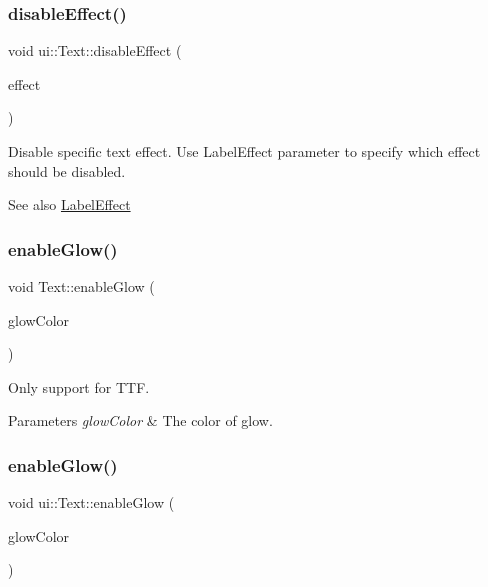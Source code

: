 \subsubsection{\texorpdfstring{disable\+Effect()}{disableEffect()}\hspace{0.1cm}{\footnotesize\ttfamily [4/4]}}
{\footnotesize\ttfamily void ui\+::\+Text\+::disable\+Effect (\begin{DoxyParamCaption}\item[{\hyperlink{group__base_ga26fd049ca5303e0cf4435208058f32e4}{Label\+Effect}}]{effect }\end{DoxyParamCaption})}

Disable specific text effect. Use Label\+Effect parameter to specify which effect should be disabled.

\begin{DoxySeeAlso}{See also}
{\ttfamily \hyperlink{group__base_ga26fd049ca5303e0cf4435208058f32e4}{Label\+Effect}} 
\end{DoxySeeAlso}
\mbox{\label{classui_1_1Text_ab97e762c34ec74d27b94077903554b8f}} 
\subsubsection{\texorpdfstring{enable\+Glow()}{enableGlow()}\hspace{0.1cm}{\footnotesize\ttfamily [1/2]}}
{\footnotesize\ttfamily void Text\+::enable\+Glow (\begin{DoxyParamCaption}\item[{const \hyperlink{structColor4B}{Color4B} \&}]{glow\+Color }\end{DoxyParamCaption})}

Only support for T\+TF.


\begin{DoxyParams}{Parameters}
{\em glow\+Color} & The color of glow. \\
\hline
\end{DoxyParams}
\mbox{\label{classui_1_1Text_a8de721b6aefd2e5e419260f17a3d8cfc}} 
\subsubsection{\texorpdfstring{enable\+Glow()}{enableGlow()}\hspace{0.1cm}{\footnotesize\ttfamily [2/2]}}
{\footnotesize\ttfamily void ui\+::\+Text\+::enable\+Glow (\begin{DoxyParamCaption}\item[{const \hyperlink{structColor4B}{Color4B} \&}]{glow\+Color }\end{DoxyParamCaption})}

